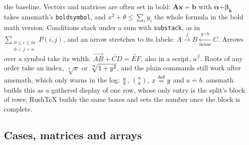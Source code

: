 \documentclass{article}
\numberwithin{equation}{section}
\theoremstyle{definition}
\theoremstyle{remark}
\begin{document}
the baseline. Vectors and matrices are often set in bold: $\boldsymbol{A}\boldsymbol{x} = \boldsymbol{b}$
with $\boldsymbol{\alpha} \boldsymbol{+} \boldsymbol{\beta}_{\boldsymbol{k}}$ takes amsmath's
\texttt{boldsymbol}, and {\boldmath $x^2 + \theta \le \sum_i y_i$} the whole formula in the bold math version. Conditions stack under a sum with
\texttt{substack}, as in $\sum_{\substack{0 \le i \le m\\ 0 < j < n}} P(i,j)$, and an arrow
stretches to its labels: $A \xrightarrow{f} B \xleftarrow[\text{below}]{g \circ h} C$. Arrows over a symbol take its width:
$\overrightarrow{AB} + \overleftarrow{CD} = \overleftrightarrow{EF}$, also in a script,
$a^{\overrightarrow{v}}$. Roots of any order take an index, $\sqrt[3]{x}$ or
$\sqrt[\uproot{2} n]{1 + y^{2}}$, and the plain commands still work after amsmath, which
only warns in the log: ${a \over b}$, ${n \choose k}$, $x \buildrel \mathrm{def} \over = y$ and
$a \doteq b$. amsmath builds this as a
gathered display of one row, whose only entry is the split's block of rows; RushTeX
builds the same boxes and sets the number once the block is complete.

\subsection{Cases, matrices and arrays}\label{sec:arrays}
\end{document}
